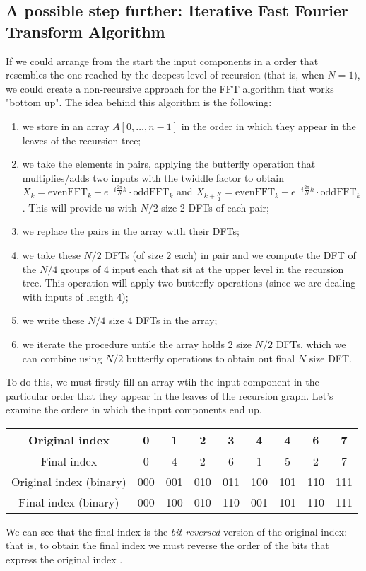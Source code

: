\documentclass[class=article,crop=false]{standalone}
\begin{document}
\subsection{A possible step further: Iterative Fast Fourier Transform Algorithm}
If we could arrange from the start the input components in a order that resembles the one reached by the deepest level of recursion (that is, when $N=1$), we could create a non-recursive approach for the FFT algorithm that works "bottom up". The idea behind this algorithm is the following:
\begin{enumerate}
\item we store in an array $A[0,\ldots,n-1]$ in the order in which they appear in the leaves of the recursion tree;
\item we take the elements in pairs, applying the butterfly operation that multiplies/adds two inputs with the twiddle factor to obtain $X_k=\text{evenFFT}_k+e^{-i\frac{2\pi}{N}k}\cdot \text{oddFFT}_k$ and $X_{k+\frac{N}{2}}=\text{evenFFT}_k-e^{-i\frac{2\pi}{N}k}\cdot \text{oddFFT}_k$. This will provide us with $N/2$ size 2 DFTs of each pair;
\item we replace the pairs in the array with their DFTs;
\item we take these $N/2$ DFTs (of size $2$ each) in pair and we compute the DFT of the $N/4$ groups of 4 input each that sit at the upper level in the recursion tree. This operation will apply two butterfly operations (since we are dealing with inputs of length 4);
\item we write these $N/4$ size 4 DFTs in the array;
\item we iterate the procedure untile the array holds 2 size $N/2$ DFTs, which we can combine using $N/2$ butterfly operations to obtain out final $N$ size DFT.
\end{enumerate}
To do this, we must firstly fill an array wtih the input component in the particular order that they appear in the leaves of the recursion graph. Let's examine the ordere in which the input components end up.\begin{center}
\begin{tabular}{|c| c c c c c c c c|}
    \hline
Original index &0 &1 &2 &3 &4 &4 &6 &7\\
\hline
Final index &0 &4 &2 &6 &1 &5 &2 &7\\
\hline
Original index (binary) &000 &001 &010 &011 &100 &101 &110 &111\\
\hline
Final index (binary) &000 &100 &010 &110 &001 &101 &110 &111\\
\hline
\end{tabular}\end{center}
We can see that the final index is the \textit{bit-reversed} version of the original index: that is, to obtain the final index we must reverse the order of the bits that express the original index \cite{introalgo}.
\end{document}
